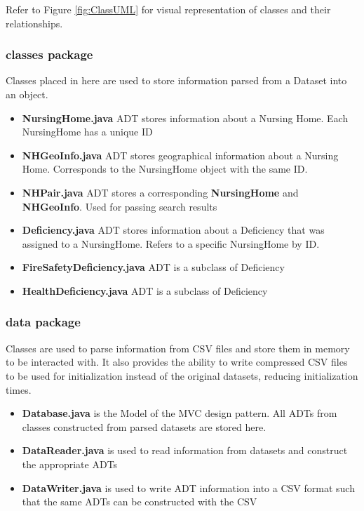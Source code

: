 \documentclass[12pt]{article}
\begin{document}
\noindent Refer to Figure \ref{fig:ClassUML} for visual representation of classes and their relationships.

\subsubsection{classes package}
Classes placed in here are used to store information parsed from a Dataset into an object.
\begin{itemize}
\item \textbf{NursingHome.java} ADT stores information about a Nursing Home. Each NursingHome has a unique ID
\item \textbf{NHGeoInfo.java} ADT stores geographical information about a Nursing Home. Corresponds to the NursingHome object with the same ID.
\item \textbf{NHPair.java} ADT stores a corresponding \textbf{NursingHome} and \textbf{NHGeoInfo}. Used for passing search results
\item \textbf{Deficiency.java} ADT stores information about a Deficiency that was assigned to a NursingHome. Refers to a specific NursingHome by ID.
\item \textbf{FireSafetyDeficiency.java} ADT is a subclass of Deficiency
\item \textbf{HealthDeficiency.java} ADT is a subclass of Deficiency
\end{itemize}

\subsubsection{data package}
Classes are used to parse information from CSV files and store them in memory to be interacted with. It also provides the ability to write compressed CSV files to be used for initialization instead of the original datasets, reducing initialization times.
\begin{itemize}
\item \textbf{Database.java} is the Model of the MVC design pattern. All ADTs from classes constructed from parsed datasets are stored here.
\item \textbf{DataReader.java} is used to read information from datasets and construct the appropriate ADTs
\item \textbf{DataWriter.java} is used to write ADT information into a CSV format such that the same ADTs can be constructed with the CSV
\end{itemize}
\end{document}
